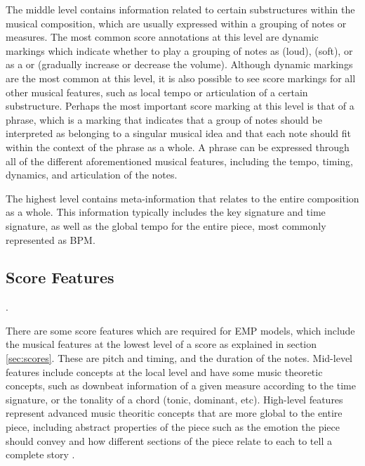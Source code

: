 The middle level contains information related to certain substructures within the musical composition, which are usually expressed within a grouping of notes or measures. The most common score annotations at this level are dynamic markings which indicate whether to play a grouping of notes as  (loud),  (soft), or as a  or  (gradually increase or decrease the volume). %
Although dynamic markings are the most common at this level, it is also possible to see score markings for all other musical features, such as local tempo or articulation of a certain substructure. Perhaps the most important score marking at this level is that of a phrase, which is a marking that indicates that a group of notes should be interpreted as belonging to a singular musical idea and that each note should fit within the context of the phrase as a whole. A phrase can be expressed through all of the different aforementioned musical features, including the tempo, timing, dynamics, and articulation of the notes.

The highest level contains meta-information that relates to the entire composition as a whole. This information typically includes the key signature and time signature, as well as the global tempo for the entire piece, most commonly represented as BPM. 

\subsection{Score Features}
.

There are some score features which are required for EMP models, which include the musical features at the lowest level of a score as explained in section \ref{sec:scores}. These are pitch and timing, and the duration of the notes. Mid-level features include concepts at the local level and have some music theoretic concepts, such as downbeat information of a given measure according to the time signature, or the tonality of a chord (tonic, dominant, etc). High-level features represent advanced music theoritic concepts that are more global to the entire piece, including abstract properties of the piece such as the emotion the piece should convey and how different sections of the piece relate to each to tell a complete story \cite{eduardo2018computational}. 

